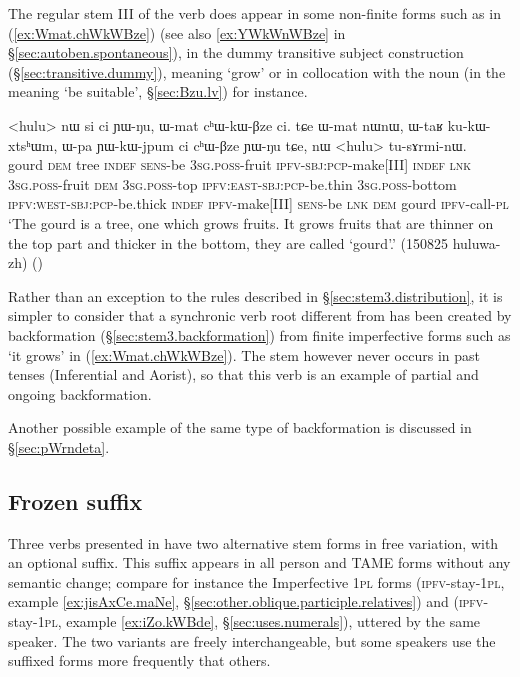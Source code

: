 The regular stem III  of the verb  does appear in some non-finite forms such as  in (\ref{ex:Wmat.chWkWBze}) (see also \ref{ex:YWkWnWBze} in §\ref{sec:autoben.spontaneous}), in the dummy transitive subject construction (§\ref{sec:transitive.dummy}), meaning `grow' or in collocation with the noun  (in the meaning `be suitable', §\ref{sec:Bzu.lv}) for instance.

\begin{exe}
\ex \label{ex:Wmat.chWkWBze}
\gll <hulu> nɯ si ci ɲɯ-ŋu, ɯ-mat cʰɯ-kɯ-βze ci. tɕe ɯ-mat nɯnɯ, ɯ-taʁ ku-kɯ-xtsʰɯm, ɯ-pa ɲɯ-kɯ-jpum ci cʰɯ-βze ɲɯ-ŋu tɕe, nɯ <hulu> tu-sɤrmi-nɯ. \\
gourd \textsc{dem} tree \textsc{indef} \textsc{sens}-be \textsc{3sg}.\textsc{poss}-fruit \textsc{ipfv}-\textsc{sbj}:\textsc{pcp}-make[III] \textsc{indef} \textsc{lnk} \textsc{3sg}.\textsc{poss}-fruit \textsc{dem} \textsc{3sg}.\textsc{poss}-top \textsc{ipfv}:\textsc{east}-\textsc{sbj}:\textsc{pcp}-be.thin \textsc{3sg}.\textsc{poss}-bottom \textsc{ipfv}:\textsc{west}-\textsc{sbj}:\textsc{pcp}-be.thick \textsc{indef} \textsc{ipfv}-make[III] \textsc{sens}-be \textsc{lnk} \textsc{dem} gourd \textsc{ipfv}-call-\textsc{pl} \\
\glt `The gourd is a tree, one which grows fruits. It grows fruits that are thinner on the top part and thicker in the bottom, they are called `gourd'.' (150825 huluwa-zh)
()
\end{exe}

Rather than an exception to the rules described in §\ref{sec:stem3.distribution}, it is simpler to consider that a synchronic verb root  different from  has been created by backformation (§\ref{sec:stem3.backformation}) from finite imperfective forms such as  `it grows' in (\ref{ex:Wmat.chWkWBze}). The stem  however never occurs in past tenses (Inferential and Aorist), so that this verb is an example of partial and ongoing backformation. 

Another possible example of the same type of backformation is discussed in §\ref{sec:pWrndeta}.

\subsection{Frozen  suffix} \label{sec:t.free.variation}
Three verbs presented in  have two alternative stem forms in free variation, with an optional  suffix. This suffix appears in all person and TAME forms without any semantic change; compare for instance the Imperfective \textsc{1pl} forms  (\textsc{ipfv}-stay-\textsc{1pl}, example \ref{ex:jisAxCe.maNe}, §\ref{sec:other.oblique.participle.relatives}) and  (\textsc{ipfv}-stay-\textsc{1pl}, example \ref{ex:iZo.kWBde}, §\ref{sec:uses.numerals}), uttered by the same speaker. The two variants are freely interchangeable, but some speakers use the  suffixed forms more frequently that others.

